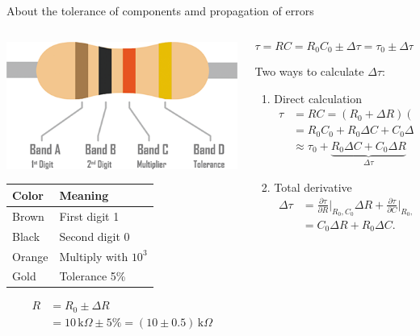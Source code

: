 \documentclass[presentation,aspectratio=169]{beamer}
\begin{document}
\begin{frame}[label={sec:org6db2167}]{About the tolerance of components amd propagation of errors}
\small
\begin{columns}
\begin{column}{0.3\columnwidth}
\begin{center}
 \includegraphics[width=.7\linewidth]{../../figures/resistor-color-code-4-band.png}
\end{center}

\begin{center}
\begin{tabular}{ll}
Color & Meaning\\
\hline
Brown & First digit 1\\
Black & Second digit 0\\
Orange & Multiply with \(10^3\)\\
Gold & Tolerance 5\%\\
\end{tabular}
\end{center}

\begin{align*}
R &= R_0 \pm \Delta R\\
&=10\, \text{k}\Omega \pm 5\% = (10 \pm 0.5)\, \text{k}\Omega
\end{align*}
\end{column}

\begin{column}{0.7\columnwidth}
\[ \tau = RC = R_0C_0 \pm \Delta\tau = \tau_0 \pm \Delta \tau \]

\pause

Two ways to calculate \(\Delta\tau\):
\footnotesize
\begin{enumerate}
\item Direct calculation \begin{align*} \tau &= RC = (R_0 + \Delta R)(C_0 + \Delta C)\\
   &= R_0C_0 + R_0\Delta C  + C_0\Delta R + \Delta R \Delta C\\
   &\approx \tau_0 + \underbrace{R_0\Delta C  + C_0\Delta R}_{\Delta\tau}
   \end{align*}
\item Total derivative \begin{align*} \Delta\tau &= \frac{\partial \tau}{\partial R} \Big|_{R_0, C_0} \Delta R + \frac{\partial \tau}{\partial C} \Big|_{R_0, C_0} \Delta C \\
&=C_0\Delta R + R_0\Delta C.
\end{align*}
\end{enumerate}


\end{column}
\end{columns}
\end{frame}
\end{document}
